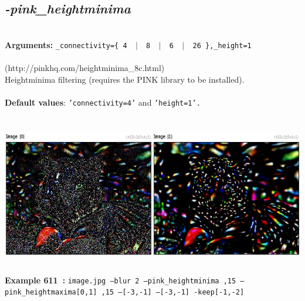 \documentclass[a4paper,11pt,twoside]{book}
\begin{document}
\subsection{\emph{-pink\_heightminima} }\vspace*{-0.5em}
~\\\textbf{Arguments: } 
{\small \texttt{\_connectivity=\{ 4 ~$|$~ 8 ~$|$~ 6 ~$|$~ 26 \},\_height=1}}\\~\\
(http://pinkhq.com/heightminima\_8c.html)
~\\Heightminima filtering (requires the PINK library to be installed).
~\\~\\\textbf{Default values}: {\small \texttt{'connectivity=4'} and \texttt{'height=1'.}}
\begin{center}\includegraphics[keepaspectratio=true,height=7cm,width=\textwidth]{img/gmic_def611.jpg}\\
{\footnotesize \textbf{Example 611~:} \texttt{image.jpg --blur 2 --pink\_heightminima ,15 --pink\_heightmaxima[0,1] ,15 --[-3,-1] --[-3,-1] -keep[-1,-2]}}
\end{center}
\end{document}
